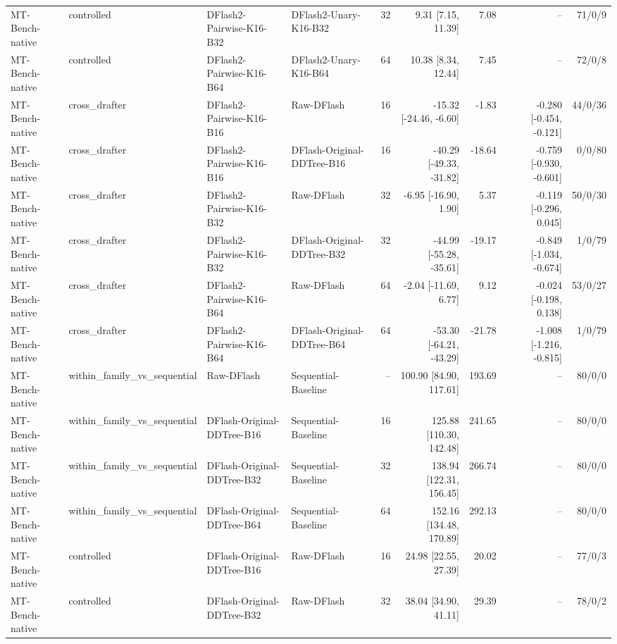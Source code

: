 \begin{longtable}{llllrrrrr}
MT-Bench-native & controlled & DFlash2-Pairwise-K16-B32 & DFlash2-Unary-K16-B32 & 32 & 9.31 [7.15, 11.39] & 7.08 & -- & 71/0/9 \\
MT-Bench-native & controlled & DFlash2-Pairwise-K16-B64 & DFlash2-Unary-K16-B64 & 64 & 10.38 [8.34, 12.44] & 7.45 & -- & 72/0/8 \\
MT-Bench-native & cross\_drafter & DFlash2-Pairwise-K16-B16 & Raw-DFlash & 16 & -15.32 [-24.46, -6.60] & -1.83 & -0.280 [-0.454, -0.121] & 44/0/36 \\
MT-Bench-native & cross\_drafter & DFlash2-Pairwise-K16-B16 & DFlash-Original-DDTree-B16 & 16 & -40.29 [-49.33, -31.82] & -18.64 & -0.759 [-0.930, -0.601] & 0/0/80 \\
MT-Bench-native & cross\_drafter & DFlash2-Pairwise-K16-B32 & Raw-DFlash & 32 & -6.95 [-16.90, 1.90] & 5.37 & -0.119 [-0.296, 0.045] & 50/0/30 \\
MT-Bench-native & cross\_drafter & DFlash2-Pairwise-K16-B32 & DFlash-Original-DDTree-B32 & 32 & -44.99 [-55.28, -35.61] & -19.17 & -0.849 [-1.034, -0.674] & 1/0/79 \\
MT-Bench-native & cross\_drafter & DFlash2-Pairwise-K16-B64 & Raw-DFlash & 64 & -2.04 [-11.69, 6.77] & 9.12 & -0.024 [-0.198, 0.138] & 53/0/27 \\
MT-Bench-native & cross\_drafter & DFlash2-Pairwise-K16-B64 & DFlash-Original-DDTree-B64 & 64 & -53.30 [-64.21, -43.29] & -21.78 & -1.008 [-1.216, -0.815] & 1/0/79 \\
MT-Bench-native & within\_family\_vs\_sequential & Raw-DFlash & Sequential-Baseline & -- & 100.90 [84.90, 117.61] & 193.69 & -- & 80/0/0 \\
MT-Bench-native & within\_family\_vs\_sequential & DFlash-Original-DDTree-B16 & Sequential-Baseline & 16 & 125.88 [110.30, 142.48] & 241.65 & -- & 80/0/0 \\
MT-Bench-native & within\_family\_vs\_sequential & DFlash-Original-DDTree-B32 & Sequential-Baseline & 32 & 138.94 [122.31, 156.45] & 266.74 & -- & 80/0/0 \\
MT-Bench-native & within\_family\_vs\_sequential & DFlash-Original-DDTree-B64 & Sequential-Baseline & 64 & 152.16 [134.48, 170.89] & 292.13 & -- & 80/0/0 \\
MT-Bench-native & controlled & DFlash-Original-DDTree-B16 & Raw-DFlash & 16 & 24.98 [22.55, 27.39] & 20.02 & -- & 77/0/3 \\
MT-Bench-native & controlled & DFlash-Original-DDTree-B32 & Raw-DFlash & 32 & 38.04 [34.90, 41.11] & 29.39 & -- & 78/0/2 \\

\end{longtable}
